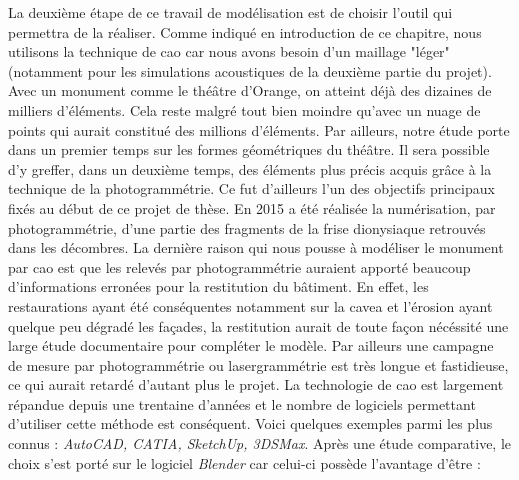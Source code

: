 La deuxième étape de ce travail de modélisation est de choisir l'outil qui permettra de la réaliser. Comme indiqué en introduction de ce chapitre, nous utilisons la technique de \gls{cao} car nous avons besoin d'un maillage "léger" (notamment pour les simulations acoustiques de la deuxième partie du projet). Avec un monument comme le théâtre d'Orange, on atteint déjà des dizaines de milliers d'éléments. Cela reste malgré tout bien moindre qu'avec un nuage de points qui aurait constitué des millions d'éléments. Par ailleurs, notre étude porte dans un premier temps sur les formes géométriques du théâtre. Il sera possible d'y greffer, dans un deuxième temps, des éléments plus précis acquis grâce à la technique de la photogrammétrie. Ce fut d'ailleurs l'un des objectifs principaux fixés au début de ce projet de thèse. En 2015 a été réalisée la numérisation, par photogrammétrie, d'une partie des fragments de la frise dionysiaque retrouvés dans les décombres. La dernière raison qui nous pousse à modéliser le monument par \gls{cao} est que les relevés par photogrammétrie auraient apporté beaucoup d'informations erronées pour la restitution du bâtiment. En effet, les restaurations ayant été conséquentes notamment sur la \gls{cavea} et l'érosion ayant quelque peu dégradé les façades, la restitution aurait de toute façon nécéssité une large étude documentaire pour compléter le modèle. Par ailleurs une campagne de mesure par photogrammétrie ou lasergrammétrie est très longue et fastidieuse, ce qui aurait retardé d'autant plus le projet. La technologie de \gls{cao} est largement répandue depuis une trentaine d'années et le nombre de logiciels permettant d'utiliser cette méthode est conséquent. Voici quelques exemples parmi les plus connus : \textit{AutoCAD, CATIA, SketchUp, 3DSMax}. Après une étude comparative, le choix s'est porté sur le logiciel \textit{Blender} car celui-ci possède l'avantage d'être :

